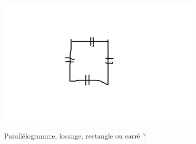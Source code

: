 
\begin{mental}
    
    \begin{center}
    \includegraphics[width=10cm]{faux_loz_ment.pdf}
    \end{center}

Parallélogramme, losange, rectangle ou carré ?

\end{mental}
